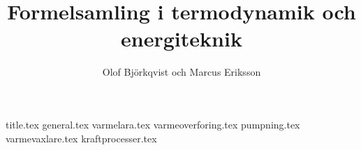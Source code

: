 \documentclass[a4paper,11pt,onecolumn,fleqn]{report}
\author{Olof Björkqvist och Marcus Eriksson}
\title{Formelsamling i termodynamik och energiteknik}
\begin{document}
{title.tex}
\tableofcontents
\setlength\LTleft{0 cm}
{general.tex}
{varmelara.tex}
{varmeoverforing.tex}
{pumpning.tex}
{varmevaxlare.tex}
{kraftprocesser.tex}
\cleardoublepage
\printglossary[title=Symboler, toctitle=Symboler, type=\acronymtype]
\cleardoublepage
{}
\printbibliography
\end{document}
